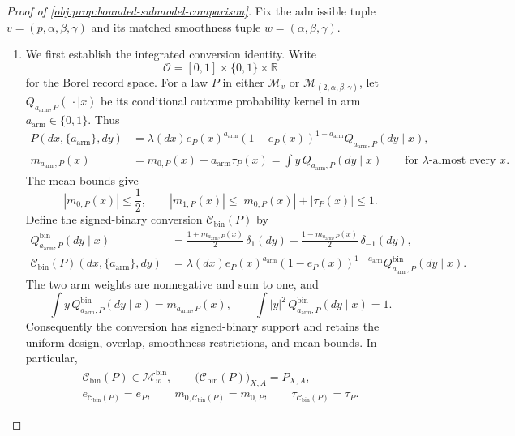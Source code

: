\begin{proof}[Proof of \cref{obj:prop:bounded-submodel-comparison}]
Fix the admissible tuple \(v=(p,\alpha,\beta,\gamma)\) and its matched smoothness tuple \(w=(\alpha,\beta,\gamma)\).

\begin{enumerate}
\item We first establish the integrated conversion identity. Write
\[
\mathcal O=[0,1]\times\{0,1\}\times\mathbb R
\]
for the Borel record space. For a law \(P\) in either
\(\mathcal M_v\) or \(\mathcal M_{(2,\alpha,\beta,\gamma)}\), let
\(Q_{a_{\mathrm{arm}},P}(\,\cdot\mid x)\) be its conditional outcome probability kernel in arm \(a_{\mathrm{arm}}\in\{0,1\}\). Thus
\[
\begin{split}
P(dx,\{a_{\mathrm{arm}}\},dy)
&=\lambda(dx)e_P(x)^{a_{\mathrm{arm}}}
  (1-e_P(x))^{1-a_{\mathrm{arm}}}
  Q_{a_{\mathrm{arm}},P}(dy\mid x),\\
m_{a_{\mathrm{arm}},P}(x)
&=m_{0,P}(x)+a_{\mathrm{arm}}\tau_P(x)
 =\int y\,Q_{a_{\mathrm{arm}},P}(dy\mid x)
 \qquad\text{for \(\lambda\)-almost every \(x\)}.
\end{split}
\]
The mean bounds give
\[
|m_{0,P}(x)|\le\frac12,\qquad
|m_{1,P}(x)|
\le |m_{0,P}(x)|+|\tau_P(x)|\le1.
\]
Define the signed-binary conversion \(\mathcal C_{\mathrm{bin}}(P)\) by
\[
\begin{split}
Q^{\mathrm{bin}}_{a_{\mathrm{arm}},P}(dy\mid x)
&=\frac{1+m_{a_{\mathrm{arm}},P}(x)}2\,\delta_1(dy)
 +\frac{1-m_{a_{\mathrm{arm}},P}(x)}2\,\delta_{-1}(dy),\\
\mathcal C_{\mathrm{bin}}(P)(dx,\{a_{\mathrm{arm}}\},dy)
&=\lambda(dx)e_P(x)^{a_{\mathrm{arm}}}
 (1-e_P(x))^{1-a_{\mathrm{arm}}}
 Q^{\mathrm{bin}}_{a_{\mathrm{arm}},P}(dy\mid x).
\end{split}
\]
The two arm weights are nonnegative and sum to one, and
\[
\int y\,Q^{\mathrm{bin}}_{a_{\mathrm{arm}},P}(dy\mid x)
=m_{a_{\mathrm{arm}},P}(x),\qquad
\int |y|^2\,Q^{\mathrm{bin}}_{a_{\mathrm{arm}},P}(dy\mid x)=1.
\]
Consequently the conversion has signed-binary support and retains the uniform design, overlap, smoothness restrictions, and mean bounds. In particular,
\[
\begin{gathered}
\mathcal C_{\mathrm{bin}}(P)\in\mathcal M_w^{\mathrm{bin}},\qquad
\bigl(\mathcal C_{\mathrm{bin}}(P)\bigr)_{X,A}=P_{X,A},\\
e_{\mathcal C_{\mathrm{bin}}(P)}=e_P,\qquad
m_{0,\mathcal C_{\mathrm{bin}}(P)}=m_{0,P},\qquad
\tau_{\mathcal C_{\mathrm{bin}}(P)}=\tau_P.
\end{gathered}
\]
\end{enumerate}
\end{proof}
